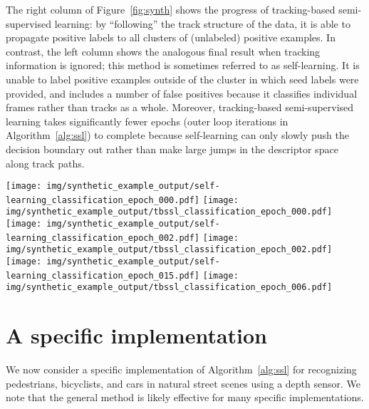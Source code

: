 \documentclass[conference]{IEEEtran}
\begin{document}
The right column of Figure~\ref{fig:synth} shows the progress of tracking-based semi-supervised learning: by ``following'' the track structure of the data, it is able to propagate positive labels to all clusters of (unlabeled) positive examples.  In contrast, the left column shows the analogous final result when tracking information is ignored; this method is sometimes referred to as self-learning.  It is unable to label positive examples outside of the cluster in which seed labels were provided, and includes a number of false positives because it classifies individual frames rather than tracks as a whole.  Moreover, tracking-based semi-supervised learning takes significantly fewer epochs (\ie outer loop iterations in Algorithm~\ref{alg:ssl}) to complete because self-learning can only slowly push the decision boundary out rather than make large jumps in the descriptor space along track paths.

\begin{figure*}
  \centering
  \texttt{[image: img/synthetic\_example\_output/self-learning\_classification\_epoch\_000.pdf]}
  \texttt{[image: img/synthetic\_example\_output/tbssl\_classification\_epoch\_000.pdf]} \\
  \texttt{[image: img/synthetic\_example\_output/self-learning\_classification\_epoch\_002.pdf]}
  \texttt{[image: img/synthetic\_example\_output/tbssl\_classification\_epoch\_002.pdf]} \\
  \texttt{[image: img/synthetic\_example\_output/self-learning\_classification\_epoch\_015.pdf]}
  \texttt{[image: img/synthetic\_example\_output/tbssl\_classification\_epoch\_006.pdf]}
\caption{A synthetic example illustrating the effect of using tracking information during semi-supervised learning (right column) compared to a method that does not (left column).  Black indicates a true negative, green a true positive, red a false positive, and white a positive example to which the semi-supervised process was unable to assign a label.  See Figure~\ref{fig:synth_track_structure} for the problem setup.}
\label{fig:synth}
\end{figure*}

\section{A specific implementation}

We now consider a specific implementation of Algorithm~\ref{alg:ssl} for recognizing pedestrians, bicyclists, and cars in natural street scenes using a depth sensor.  We note that the general method is likely effective for many specific implementations.
\end{document}
